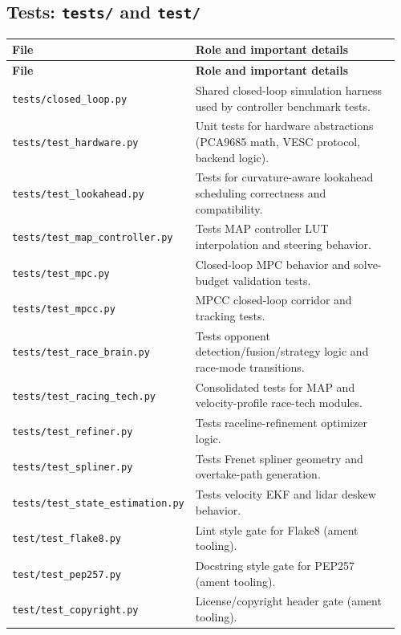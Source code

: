 \documentclass[11pt]{article}
\begin{document}
\subsection{Tests: \texttt{tests/} and \texttt{test/}}
\begin{longtable}{p{0.30\linewidth}p{0.66\linewidth}}
\toprule
\textbf{File} & \textbf{Role and important details} \\
\midrule
\endfirsthead
\toprule
\textbf{File} & \textbf{Role and important details} \\
\midrule
\endhead
\texttt{tests/closed\_loop.py} & Shared closed-loop simulation harness used by controller benchmark tests. \\
\texttt{tests/test\_hardware.py} & Unit tests for hardware abstractions (PCA9685 math, VESC protocol, backend logic). \\
\texttt{tests/test\_lookahead.py} & Tests for curvature-aware lookahead scheduling correctness and compatibility. \\
\texttt{tests/test\_map\_controller.py} & Tests MAP controller LUT interpolation and steering behavior. \\
\texttt{tests/test\_mpc.py} & Closed-loop MPC behavior and solve-budget validation tests. \\
\texttt{tests/test\_mpcc.py} & MPCC closed-loop corridor and tracking tests. \\
\texttt{tests/test\_race\_brain.py} & Tests opponent detection/fusion/strategy logic and race-mode transitions. \\
\texttt{tests/test\_racing\_tech.py} & Consolidated tests for MAP and velocity-profile race-tech modules. \\
\texttt{tests/test\_refiner.py} & Tests raceline-refinement optimizer logic. \\
\texttt{tests/test\_spliner.py} & Tests Frenet spliner geometry and overtake-path generation. \\
\texttt{tests/test\_state\_estimation.py} & Tests velocity EKF and lidar deskew behavior. \\
\texttt{test/test\_flake8.py} & Lint style gate for Flake8 (ament tooling). \\
\texttt{test/test\_pep257.py} & Docstring style gate for PEP257 (ament tooling). \\
\texttt{test/test\_copyright.py} & License/copyright header gate (ament tooling). \\
\bottomrule
\end{longtable}
\end{document}
